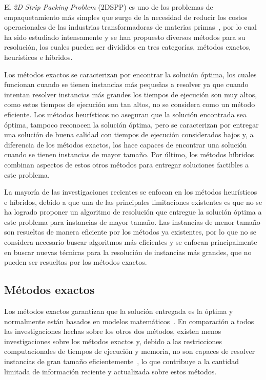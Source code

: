 \documentclass[letter, 10pt]{article}
\begin{document}
El \emph{2D Strip Packing Problem} (2DSPP) es uno de los problemas de empaquetamiento m\'as simples que surge de la necesidad de reducir los costos operacionales de las industrias transformadoras de materias primas~\cite{junior2022rectangular}, por lo cual ha sido estudiado intensamente y se han propuesto diversos m\'etodos para su resoluci\'on, los cuales pueden ser divididos en tres categor\'ias, m\'etodos exactos, heur\'isticos e h\'ibridos.

Los m\'etodos exactos se caracterizan por encontrar la soluci\'on \'optima, los cuales funcionan cuando se tienen instancias m\'as peque\~nas a resolver ya que cuando intentan resolver instancias m\'as grandes los tiempos de ejecuci\'on son muy altos, como estos tiempos de ejecuci\'on son tan altos, no se considera como un m\'etodo eficiente. Los m\'etodos heur\'isticos no aseguran que la soluci\'on encontrada sea \'optima, tampoco reconocen la soluci\'on \'optima, pero se caracterizan por entregar una soluci\'on de buena calidad con tiempos de ejecuci\'on considerados bajos y, a diferencia de los m\'etodos exactos, los hace capaces de encontrar una soluci\'on cuando se tienen instancias de mayor tama\~no. Por \'ultimo, los m\'etodos h\'ibridos combinan aspectos de estos otros m\'etodos para entregar soluciones factibles a este problema.

La mayor\'ia de las investigaciones recientes se enfocan en los m\'etodos heur\'isticos e h\'ibridos, debido a que una de las principales limitaciones existentes es que no se ha logrado proponer un algoritmo de resoluci\'on que entregue la soluci\'on \'optima a este problema para instancias de mayor tama\~no. Las instancias de menor tama\~no son resueltas de manera eficiente por los m\'etodos ya existentes, por lo que no se considera necesario buscar algoritmos m\'as eficientes y se enfocan principalmente en buscar nuevas t\'ecnicas para la resoluci\'on de instancias m\'as grandes, que no pueden ser resueltas por los m\'etodos exactos.

\subsection{M\'etodos exactos}

Los m\'etodos exactos garantizan que la soluci\'on entregada es la \'optima y normalmente est\'an basados en modelos matem\'aticos~\cite{oliveira2016survey}. En comparaci\'on a todos las investigaciones hechas sobre los otros dos m\'etodos, existen menos investigaciones sobre los m\'etodos exactos y, debido a las restricciones computacionales de tiempos de ejecuci\'on y memoria, no son capaces de resolver instancias de gran tama\~no eficientemente~\cite{he2013heuristics}, lo que contribuye a la cantidad limitada de informaci\'on reciente y actualizada sobre estos m\'etodos.
\end{document}
